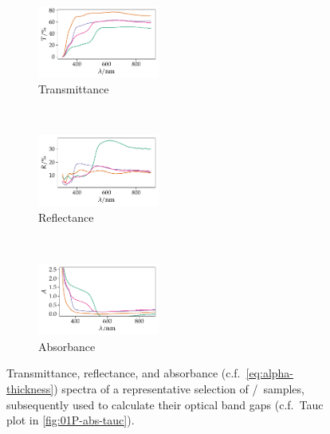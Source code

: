 \documentclass[webedition,openright,titles,swedish,english]{LuaUUThesis}\usepackage[]{graphicx}\usepackage[]{xcolor}
\newenvironment{knitrout}{}{} %
\newcommand{\cf}{c.f.}
\begin{document}
\begin{figure}[tbp]
\centering
\begin{subfigure}[b]{0.32\textwidth}
\centering
\begin{knitrout}\scriptsize
{}\color{fgcolor}

{\centering \includegraphics[width=1.57in]{figure/0501P-fig-uvvisir-transmittance-1} 

}


\end{knitrout}
\caption{Transmittance}
\label{fig:P01-uvvisir-transmittance}
\end{subfigure}%
\,%
\begin{subfigure}[b]{0.32\textwidth}
\centering
\begin{knitrout}\scriptsize
{}\color{fgcolor}

{\centering \includegraphics[width=1.57in]{figure/0501P-fig-uvvisir-reflectance-1} 

}


\end{knitrout}
\caption{Reflectance}
\label{fig:P01-uvvisir-reflectance}
\end{subfigure}%
\,%
\begin{subfigure}[b]{0.32\textwidth}
\centering
\begin{knitrout}\scriptsize
{}\color{fgcolor}

{\centering \includegraphics[width=1.57in]{figure/0501P-fig-uvvisir-absorbance-1} 

}


\end{knitrout}
\caption{Absorbance}
\label{fig:P01-uvvisir-absorbance}
\end{subfigure}%
\caption[Optical spectra of ZnO/CdS nanorod arrays]{%
   Transmittance, reflectance, and absorbance (\cf\ \cref{eq:alpha-thickness}) spectra
   of a representative selection of \ZnO/\CdS\ samples, subsequently used
   to calculate their optical band gaps (\cf\ Tauc plot in \cref{fig:01P-abs-tauc}).}
\label{fig:P01-uvvisir}
\end{figure}
\end{document}
